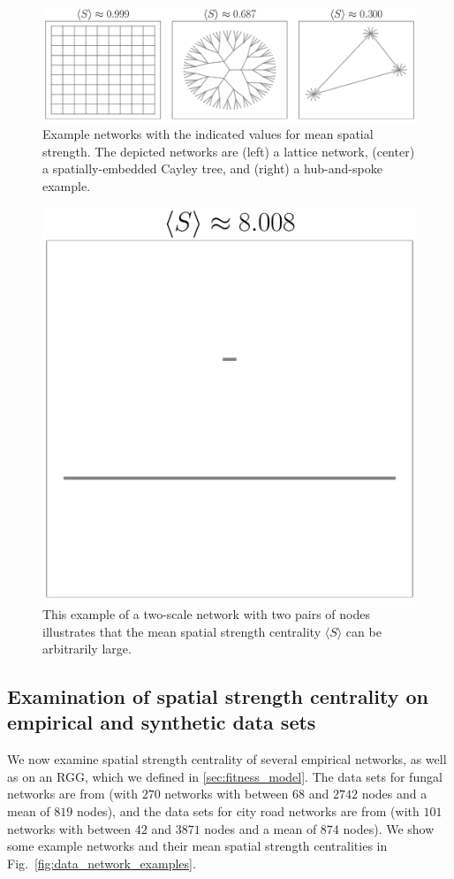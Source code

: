 \documentclass[%
 reprint,
 amsmath,amssymb,
 aps,
]{revtex4-1}
\begin{document}
\begin{figure}
    \centering
    \includegraphics[width=1.0\linewidth]{toy_network_examples.pdf}
    \caption{Example networks with the indicated values for mean spatial strength. The depicted networks are (left) a lattice network, (center) a spatially-embedded Cayley tree, and (right) a hub-and-spoke example.
    }
    \label{fig:toy_network_examples}
\end{figure}




\begin{figure}
    \centering
    \includegraphics[width=0.4\linewidth]{breaking_example_spatial_strength.pdf}
    \caption{This example of a two-scale network with two pairs of nodes illustrates that the mean spatial strength centrality $\langle S \rangle$ can be arbitrarily large.
    }
    \label{fig:breaking_example}
\end{figure}


\subsection{Examination of spatial strength centrality on empirical and synthetic data sets}\label{data}

We now examine spatial strength centrality of several empirical networks, as well as on an RGG, {\color{red}which we defined in \ref{sec:fitness_model}.}
The data sets for fungal networks are from \cite{fungal_data} (with $270$ networks with between $68$ and $2742$ nodes and a mean 
of $819$ nodes), and the data sets for city road networks are from \cite{road_data} (with $101$ networks with between $42$ and $3871$ nodes and a mean 
of $874$ nodes). We show some example networks and their mean spatial strength centralities in Fig.~\ref{fig:data_network_examples}.
\end{document}
